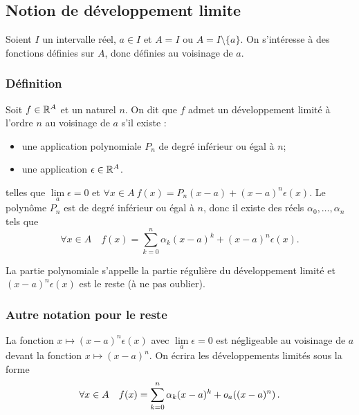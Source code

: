 \subsection{Notion de développement limite}

Soient \(I\) un intervalle réel, \(a \in I\) et \(A=I\) ou 
\(A=I\setminus\{a\}\). On s'intéresse à des fonctions définies sur \(A\), donc 
définies au voisinage de \(a\).

\subsubsection{Définition}

\begin{defdef}
  Soit \(f \in \mathbb{R}^A\) et un naturel \(n\). On dit que \(f\) admet un 
  développement limité à l'ordre \(n\) au voisinage de \(a\) s'il existe :
  \begin{itemize}
    \item une application polynomiale \(P_n\) de degré inférieur ou égal à 
      \(n\);
    \item une application \(\epsilon \in \mathbb{R}^A\).
  \end{itemize}
  telles que \(\lim\limits_{a}\epsilon = 0\) et \(\forall x \in A \ 
  f(x)=P_n(x-a) + (x-a)^n\epsilon(x)\). Le polynôme \(P_n\) est de degré 
  inférieur ou égal à \(n\), donc il existe des réels \(\alpha_0, \ldots, 
  \alpha_n\) tels que
  \begin{equation}
    \forall x \in A \quad f(x) = \sum_{k=0}^n \alpha_k(x-a)^k + 
    (x-a)^n\epsilon(x).
  \end{equation}
\end{defdef}
La partie polynomiale s'appelle la partie régulière du développement limité et 
\((x-a)^n\epsilon(x)\) est le reste (à ne pas oublier).

\subsubsection{Autre notation pour le reste}

La fonction \(x \longmapsto (x-a)^n \epsilon(x)\) avec \(\lim\limits_{a}\epsilon 
= 0\) est négligeable au voisinage de \(a\) devant la fonction \(x \longmapsto 
(x-a)^n\). On écrira les développements limités sous la forme
\begin{equation}
  \forall x \in A \quad f(x) = \sum_{k=0}^n \alpha_k(x-a)^k + 
  o\mathopen{}_{a}\left((x-a)^n\right).
\end{equation}

